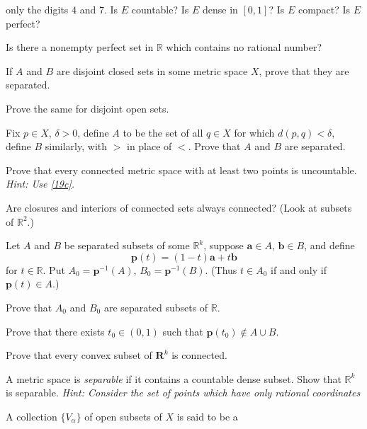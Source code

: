 \begin{exercise}
  only the digits \(4\) and \(7\).
  Is \(E\) countable?
  Is \(E\) dense in \([0, 1]\)?
  Is \(E\) compact?
  Is \(E\) perfect?
\item
  Is there a nonempty perfect set in \(\mathbb{R}\) which contains no rational
  number?
\item
  \begin{exercise}[label = (\alph*), ref = \arabic{exercisei} (\alph*)]
  \item
    If \(A\) and \(B\) are disjoint closed sets in some metric space \(X\),
    prove that they are separated.
  \item
    Prove the same for disjoint open sets.
  \item
    \label{19c}
    Fix \(p\in X\), \(\delta > 0\), define \(A\) to be the set of all
    \(q\in X\) for which \(d(p, q) < \delta\), define \(B\) similarly, with
    \(>\) in place of \(<\).
    Prove that \(A\) and \(B\) are separated.
  \item
    Prove that every connected metric space with at least two points is
    uncountable.
    \textit{Hint: Use \cref{19c}.}
  \end{exercise}
\item
  Are closures and interiors of connected sets always connected?
  (Look at subsets of \(\mathbb{R}^2\).)
\item
  Let \(A\) and \(B\) be separated subsets of some \(\mathbb{R}^k\), suppose
  \(\mathbold{a}\in A\), \(\mathbold{b}\in B\), and define
  \[
  \mathbold{p}(t) = (1 - t)\mathbold{a} + t\mathbold{b}
  \]
  for \(t\in\mathbb{R}\).
  Put \(A_0 = \mathbold{p}^{-1}(A)\), \(B_0 = \mathbold{p}^{-1}(B)\).
  (Thus \(t\in A_0\) if and only if \(\mathbold{p}(t)\in A\).)
  \begin{exercise}[label = (\alph*)]
  \item
    Prove that \(A_0\) and \(B_0\) are separated subsets of \(\mathbb{R}\).
  \item
    Prove that there exists \(t_0\in (0, 1)\) such that
    \(\mathbold{p}(t_0)\not\in A\cup B\).
  \item
    Prove that every convex subset of \(\mathbold{R}^k\) is connected.
  \end{exercise}
\item
  A metric space is \textit{separable} if it contains a countable dense subset.
  Show that \(\mathbb{R}^k\) is separable.
  \textit{Hint: Consider the set of points which have only rational
    coordinates}
\item
  A collection \(\{V_{\alpha}\}\) of open subsets of \(X\) is said to be a

\end{exercise}
